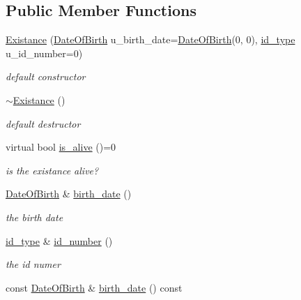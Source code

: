 \subsection*{Public Member Functions}
\begin{DoxyCompactItemize}
\item 
\hypertarget{classExistance_a415f1af7d255f9301b0a12c801404d6a}{
\hyperlink{classExistance_a415f1af7d255f9301b0a12c801404d6a}{Existance} (\hyperlink{classDateOfBirth}{DateOfBirth} u\_\-birth\_\-date=\hyperlink{classDateOfBirth}{DateOfBirth}(0, 0), \hyperlink{classExistance_a82c4092964457cd7da30d53072c62f1a}{id\_\-type} u\_\-id\_\-number=0)}
\label{classExistance_a415f1af7d255f9301b0a12c801404d6a}

\begin{DoxyCompactList}\small\item\em default constructor \end{DoxyCompactList}\item 
\hypertarget{classExistance_a38ff86bfab06fdc0b19af335b502165a}{
\hyperlink{classExistance_a38ff86bfab06fdc0b19af335b502165a}{$\sim$Existance} ()}
\label{classExistance_a38ff86bfab06fdc0b19af335b502165a}

\begin{DoxyCompactList}\small\item\em default destructor \end{DoxyCompactList}\item 
virtual bool \hyperlink{classExistance_ab86c25a779d30c45e26031e47c7b45dc}{is\_\-alive} ()=0
\begin{DoxyCompactList}\small\item\em is the existance alive? \end{DoxyCompactList}\item 
\hyperlink{classDateOfBirth}{DateOfBirth} \& \hyperlink{classExistance_a5ed0fe6062a67abff1df3ce4cae109b0}{birth\_\-date} ()
\begin{DoxyCompactList}\small\item\em the birth date \end{DoxyCompactList}\item 
\hyperlink{classExistance_a82c4092964457cd7da30d53072c62f1a}{id\_\-type} \& \hyperlink{classExistance_a23533e617509b239de916fe90811f27a}{id\_\-number} ()
\begin{DoxyCompactList}\small\item\em the id numer \end{DoxyCompactList}\item 
\hypertarget{classExistance_a1bf4ab1ba9b880175b49f914736ccd54}{
const \hyperlink{classDateOfBirth}{DateOfBirth} \& \hyperlink{classExistance_a1bf4ab1ba9b880175b49f914736ccd54}{birth\_\-date} () const }
\label{classExistance_a1bf4ab1ba9b880175b49f914736ccd54}


\end{DoxyCompactItemize}
